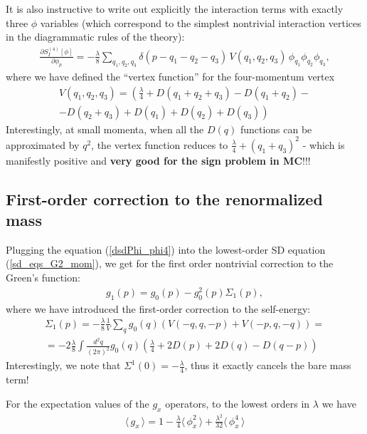 \documentclass[12pt]{article}
\newcommand{\lr}[1]{ \left( #1 \right) }
\newcommand{\lrs}[1]{ \left[ #1 \right] }
\newcommand{\vev}[1]{ \langle \, #1 \, \rangle }
\begin{document}
It is also instructive to write out explicitly the interaction terms with exactly three $\phi$ variables (which correspond to the simplest nontrivial interaction vertices in the diagrammatic rules of the theory):
\begin{eqnarray}
\label{dsdPhi_phi4}
 \frac{\partial S_I^{\lr{4}}\lrs{\phi}}{\partial \phi_p}
 =
 - \frac{\lambda}{8}
 \sum\limits_{q_1, q_2, q_3}
 \delta\lr{p - q_1 - q_2 - q_3} \,
 V\lr{q_1, q_2, q_3} \,
 \phi_{q_1} \phi_{q_2} \phi_{q_3} ,
\end{eqnarray}
where we have defined the ``vertex function'' for the four-momentum vertex
\begin{eqnarray}
\label{vertex_function4}
 V\lr{q_1, q_2, q_3} = 
 \left(\frac{\lambda}{4} + D\lr{q_1 + q_2 + q_3} - D\lr{q_1 + q_2} 
 - \right. \nonumber \\ \left. - 
 D\lr{q_2 + q_3} + D\lr{q_1} + D\lr{q_2} + D\lr{q_3}\right)
\end{eqnarray}
Interestingly, at small momenta, when all the $D\lr{q}$ functions can be approximated by $q^2$, the vertex function reduces to $\frac{\lambda}{4} + \lr{q_1 + q_3}^2$ - which is manifestly positive and \textbf{very good for the sign problem in MC}!!!

\subsection{First-order correction to the renormalized mass}

 Plugging the equation (\ref{dsdPhi_phi4}) into the lowest-order SD equation (\ref{sd_eqs_G2_mom}), we get for the first order nontrivial correction to the Green's function:
\begin{eqnarray}
\label{g1}
 g_1\lr{p} = g_0\lr{p} - g_0^2\lr{p} \Sigma_1\lr{p} ,
\end{eqnarray}
where we have introduced the first-order correction to the self-energy:
\begin{eqnarray}
\label{self_energy}
 \Sigma_1\lr{p} = - \frac{\lambda}{8} \frac{1}{V} \sum\limits_q g_0\lr{q} \lr{V\lr{-q, q, -p} + V\lr{-p, q, -q}}
 = \nonumber \\ =
 - 2 \frac{\lambda}{8} \int \frac{d^2 q}{\lr{2 \pi}^2} g_0\lr{q} \lr{\frac{\lambda}{4} + 2 D\lr{p} + 2 D\lr{q} - D\lr{q - p}}
\end{eqnarray}
Interestingly, we note that $\Sigma^1\lr{0} = -\frac{\lambda}{4}$, thus it exactly cancels the bare mass term!

For the expectation values of the $g_x$ operators, to the lowest orders in $\lambda$ we have
\begin{eqnarray}
\label{gx_vev_lowest}
 \vev{g_x} = 1 - \frac{\lambda}{4} \vev{\phi_x^2} + \frac{\lambda^2}{32} \vev{\phi_x^4}
\end{eqnarray}
\end{document}
